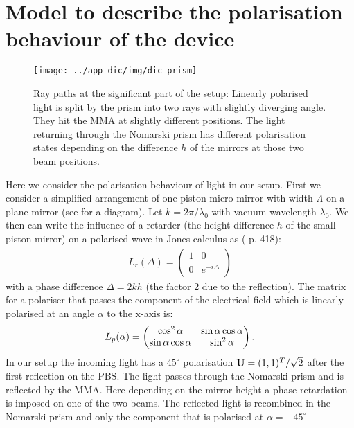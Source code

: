 \section{Model to describe the polarisation behaviour of the device}
\begin{figure}[htb]
  \centering
  \texttt{[image: ../app\_dic/img/dic\_prism]}

  \caption{ Ray paths at the significant part of the setup: Linearly
    polarised light is split by the prism into two rays with slightly
    diverging angle. They hit the MMA at slightly different
    positions. The light returning through the Nomarski prism has
    different polarisation states depending on the difference $h$ of
    the mirrors at those two beam positions.  }
  \label{fig:prism}
\end{figure}
Here we consider the polarisation behaviour of light in our setup.
First we consider a simplified arrangement of one piston micro mirror
with width $\Lambda$ on a plane mirror (see  for a
diagram).  Let $k=2\pi/\lambda_0$ with vacuum wavelength
$\lambda_0$. We then can write the influence of a retarder (the height
difference $h$ of the small piston mirror) on a polarised wave in
Jones calculus as (\cite{1996Goodman} p. 418):
\begin{align}
L_r(\Delta)=\begin{pmatrix}1&0\\ 0&e^{-i\Delta}\end{pmatrix}
\end{align}
with a phase difference $\Delta=2kh$ (the factor 2 due to the
reflection).  The matrix for a polariser that passes the component of
the electrical field which is linearly polarised at an angle $\alpha$
to the x-axis is:
\begin{align}
L_p(\alpha)=\begin{pmatrix}\cos^2\alpha&\sin\alpha\cos\alpha\cr
  \sin\alpha\cos\alpha&\sin^2\alpha\end{pmatrix}.
\end{align}
In our setup the incoming light has a $45^\circ$ polarisation $\mathbf{U}=(1,1)^T/\sqrt{2}$ after the first reflection on the PBS. The light
passes through the Nomarski prism and is reflected by the MMA. Here
depending on the mirror height a phase retardation is imposed on one
of the two beams. The reflected light is recombined in the Nomarski
prism and only the component that is polarised at $\alpha=-45^\circ$
